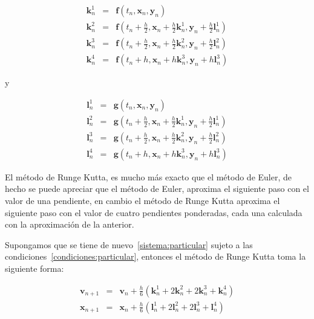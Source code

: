 \begin{eqnarray}
\textbf{k}_{n}^{1} & = & \textbf{f}(t_n, \textbf{x}_n, \textbf{y}_n) \nonumber \\
\textbf{k}_{n}^{2} & = & \textbf{f}(t_n + \frac{h}{2}, \textbf{x}_n + \frac{h}{2} \textbf{k}_{n}^{1}, \textbf{y}_n + \frac{h}{2}\textbf{l}_{n}^{1}) \nonumber \\
\textbf{k}_{n}^{3} & = & \textbf{f}(t_n + \frac{h}{2}, \textbf{x}_n + \frac{h}{2} \textbf{k}_{n}^{2}, \textbf{y}_n + \frac{h}{2}\textbf{l}_{n}^{2}) \nonumber \\
\textbf{k}_{n}^{4} & = & \textbf{f}(t_n + h, \textbf{x}_n + h\textbf{k}_{n}^{3}, \textbf{y}_n + h\textbf{l}_{n}^{3}) \nonumber
\end{eqnarray}

y

\begin{eqnarray}
\textbf{l}_{n}^{1} & = & \textbf{g}(t_n, \textbf{x}_n, \textbf{y}_n) \nonumber \\
\textbf{l}_{n}^{2} & = & \textbf{g}(t_n + \frac{h}{2}, \textbf{x}_n + \frac{h}{2} \textbf{k}_{n}^{1}, \textbf{y}_n + \frac{h}{2}\textbf{l}_{n}^{1}) \nonumber \\
\textbf{l}_{n}^{3} & = & \textbf{g}(t_n + \frac{h}{2}, \textbf{x}_n + \frac{h}{2} \textbf{k}_{n}^{2}, \textbf{y}_n + \frac{h}{2}\textbf{l}_{n}^{2}) \nonumber \\
\textbf{l}_{n}^{4} & = & \textbf{g}(t_n + h, \textbf{x}_n + h\textbf{k}_{n}^{3}, \textbf{y}_n + h\textbf{l}_{n}^{3}) \nonumber
\end{eqnarray}


El método de Runge Kutta, es mucho más exacto que el método de Euler, de hecho se puede apreciar que el método de Euler, aproxima el siguiente paso con el valor de una pendiente, en cambio el método de Runge Kutta aproxima el siguiente paso con el valor de cuatro pendientes ponderadas, cada una calculada con la aproximación de la anterior.

Supongamos que se tiene de nuevo~\eqref{sistema:particular} sujeto a las condiciones~\eqref{condiciones:particular}, entonces el método de Runge Kutta toma la siguiente forma:

\begin{eqnarray}
\textbf{v}_{n+1} & = & \textbf{v}_n + \frac{h}{6}(\textbf{k}_{n}^{1} + 2\textbf{k}_{n}^{2} + 2\textbf{k}_{n}^{3} + \textbf{k}_{n}^{4}) \nonumber \\
\textbf{x}_{n+1} & = & \textbf{x}_n + \frac{h}{6}(\textbf{l}_{n}^{1} + 2\textbf{l}_{n}^{2} + 2\textbf{l}_{n}^{3} + \textbf{l}_{n}^{4})
\label{formulas:RK4}
\end{eqnarray}

